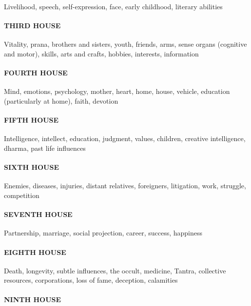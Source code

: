 Livelihood, speech, self-expression, face, early childhood, literary abilities

\paragraph{THIRD HOUSE}

Vitality, prana, brothers and sisters, youth, friends, arms, sense organs (cognitive and motor), skills, arts and crafts, hobbies, interests, information

\paragraph{FOURTH HOUSE}

Mind, emotions, psychology, mother, heart, home, house, vehicle, education (particularly at home), faith, devotion

\paragraph{FIFTH HOUSE}

Intelligence, intellect, education, judgment, values, children, creative intelligence, dharma, past life influences

\paragraph{SIXTH HOUSE}

Enemies, diseases, injuries, distant relatives, foreigners,  litigation, work, struggle, competition

\paragraph{SEVENTH HOUSE}

Partnership, marriage, social projection, career, success, happiness

\paragraph{EIGHTH HOUSE}

Death, longevity, subtle influences, the occult, medicine, Tantra, collective resources, corporations,  loss of fame, deception, calamities

\paragraph{NINTH HOUSE}

